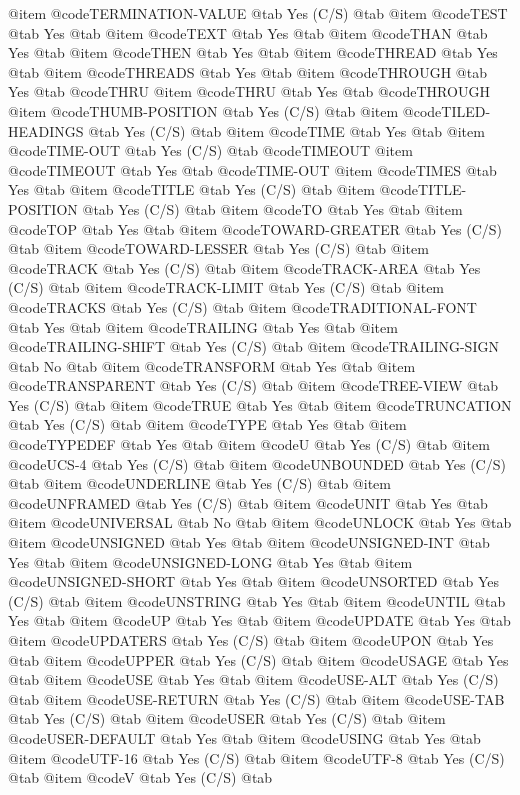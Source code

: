 @item @code{TERMINATION-VALUE} @tab Yes	(C/S) @tab
@item @code{TEST} @tab Yes @tab
@item @code{TEXT} @tab Yes @tab
@item @code{THAN} @tab Yes @tab
@item @code{THEN} @tab Yes @tab
@item @code{THREAD} @tab Yes @tab
@item @code{THREADS} @tab Yes @tab
@item @code{THROUGH} @tab Yes @tab @code{THRU}
@item @code{THRU} @tab Yes @tab @code{THROUGH}
@item @code{THUMB-POSITION} @tab Yes	(C/S) @tab
@item @code{TILED-HEADINGS} @tab Yes	(C/S) @tab
@item @code{TIME} @tab Yes @tab
@item @code{TIME-OUT} @tab Yes	(C/S) @tab @code{TIMEOUT}
@item @code{TIMEOUT} @tab Yes @tab @code{TIME-OUT}
@item @code{TIMES} @tab Yes @tab
@item @code{TITLE} @tab Yes	(C/S) @tab
@item @code{TITLE-POSITION} @tab Yes	(C/S) @tab
@item @code{TO} @tab Yes @tab
@item @code{TOP} @tab Yes @tab
@item @code{TOWARD-GREATER} @tab Yes	(C/S) @tab
@item @code{TOWARD-LESSER} @tab Yes	(C/S) @tab
@item @code{TRACK} @tab Yes (C/S) @tab
@item @code{TRACK-AREA} @tab Yes (C/S) @tab
@item @code{TRACK-LIMIT} @tab Yes (C/S) @tab
@item @code{TRACKS} @tab Yes (C/S) @tab
@item @code{TRADITIONAL-FONT} @tab Yes @tab
@item @code{TRAILING} @tab Yes @tab
@item @code{TRAILING-SHIFT} @tab Yes	(C/S) @tab
@item @code{TRAILING-SIGN} @tab No @tab
@item @code{TRANSFORM} @tab Yes @tab
@item @code{TRANSPARENT} @tab Yes	(C/S) @tab
@item @code{TREE-VIEW} @tab Yes	(C/S) @tab
@item @code{TRUE} @tab Yes @tab
@item @code{TRUNCATION} @tab Yes	(C/S) @tab
@item @code{TYPE} @tab Yes @tab
@item @code{TYPEDEF} @tab Yes @tab
@item @code{U} @tab Yes	(C/S) @tab
@item @code{UCS-4} @tab Yes	(C/S) @tab
@item @code{UNBOUNDED} @tab Yes	(C/S) @tab
@item @code{UNDERLINE} @tab Yes	(C/S) @tab
@item @code{UNFRAMED} @tab Yes	(C/S) @tab
@item @code{UNIT} @tab Yes @tab
@item @code{UNIVERSAL} @tab No @tab
@item @code{UNLOCK} @tab Yes @tab
@item @code{UNSIGNED} @tab Yes @tab
@item @code{UNSIGNED-INT} @tab Yes @tab
@item @code{UNSIGNED-LONG} @tab Yes @tab
@item @code{UNSIGNED-SHORT} @tab Yes @tab
@item @code{UNSORTED} @tab Yes	(C/S) @tab
@item @code{UNSTRING} @tab Yes @tab
@item @code{UNTIL} @tab Yes @tab
@item @code{UP} @tab Yes @tab
@item @code{UPDATE} @tab Yes @tab
@item @code{UPDATERS} @tab Yes	(C/S) @tab
@item @code{UPON} @tab Yes @tab
@item @code{UPPER} @tab Yes	(C/S) @tab
@item @code{USAGE} @tab Yes @tab
@item @code{USE} @tab Yes @tab
@item @code{USE-ALT} @tab Yes	(C/S) @tab
@item @code{USE-RETURN} @tab Yes	(C/S) @tab
@item @code{USE-TAB} @tab Yes	(C/S) @tab
@item @code{USER} @tab Yes	(C/S) @tab
@item @code{USER-DEFAULT} @tab Yes @tab
@item @code{USING} @tab Yes @tab
@item @code{UTF-16} @tab Yes	(C/S) @tab
@item @code{UTF-8} @tab Yes	(C/S) @tab
@item @code{V} @tab Yes	(C/S) @tab
